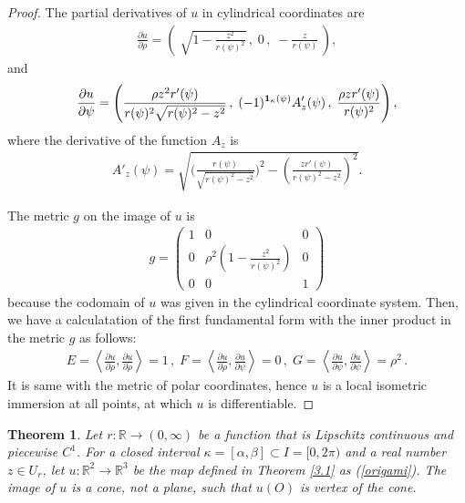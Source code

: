 \documentclass{amsart}
\theoremstyle{plain}
\newtheorem{theorem}{Theorem}[section]
\theoremstyle{definition}
\theoremstyle{remark}
\begin{document}
\begin{proof}%
The partial derivatives of $u$ in cylindrical coordinates are
\begin{align*}
\frac{\partial u}{\partial\rho}=\left(\;\sqrt{1-\frac{z^2}{r(\psi)^2}}\,,\;0\,,\;-\frac{z}{r(\psi)}\,\right),
\end{align*}
and
\begin{align*}
\frac{\partial u}{\partial\psi}=\left(\frac{\rho z^2r'(\psi)}{r(\psi)^2\sqrt{r(\psi)^2-z^2}}\,,\;(-1)^{\bold{1}_{\kappa}(\psi)}A'_z(\psi)\,,\;\frac{\rho zr'(\psi)}{r(\psi)^2}\right),
\end{align*}
where the derivative of the function $A_z$ is
\begin{align*}
A'_z(\psi)=\sqrt{\biggl(\frac{r(\psi)}{\sqrt{r(\psi)^2-z^2}}\biggr)^2-\left(\frac{zr'(\psi)}{r(\psi)^2-z^2}\right)^2}.
\end{align*}

The metric $g$ on the image of $u$ is
\begin{align*}
g=\begin{pmatrix}1&0&0\\0&\rho^2\left(1-\frac{z^2}{r(\psi)^2}\right)&0\\0&0&1\end{pmatrix}
\end{align*}
because the codomain of $u$ was given in the cylindrical coordinate system.
Then, we have a calculatation of the first fundamental form with the inner product in the metric $g$ as follows:
\begin{align*}
E=\left\langle\frac{\partial u}{\partial\rho},\frac{\partial u}{\partial\rho}\right\rangle=1\,,\;
F=\left\langle\frac{\partial u}{\partial\rho},\frac{\partial u}{\partial\psi}\right\rangle=0\,,\;
G=\left\langle\frac{\partial u}{\partial\psi},\frac{\partial u}{\partial\psi}\right\rangle=\rho^2\,.
\end{align*}
It is same with the metric of polar coordinates, hence $u$ is a local isometric immersion at all points, at which $u$ is differentiable.
\end{proof}





\begin{theorem}\label{4.2} %
Let $r:\mathbb{R}\to(0,\infty)$ be a function that is Lipschitz continuous and piecewise $C^1$.
For a closed interval $\kappa=[\alpha,\beta]\subset I=[0,2\pi)$ and a real number $z\in U_r$, let $u:\mathbb{R}^2\to\mathbb{R}^3$ be the map defined in Theorem \ref{3.1} as (\ref{origami}).
The image of $u$ is a cone, not a plane, such that $u(O)$ is vertex of the cone.
\end{theorem}
\end{document}
